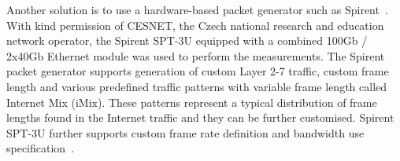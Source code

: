 Another solution is to use a hardware-based packet generator such as Spirent~\cite{spirent}.
With kind permission of CESNET, the Czech national research and education network operator,
the Spirent SPT-3U equipped with a combined 100Gb / 2x40Gb Ethernet module was used to perform the measurements.
The Spirent packet generator supports generation of custom Layer 2-7 traffic, custom frame length and various
predefined traffic patterns with variable frame length called Internet Mix (iMix).
These patterns represent a typical distribution of frame lengths found in the Internet traffic
and they can be further customised.
Spirent SPT-3U further supports custom frame rate definition and bandwidth use specification~\cite{spirent}.

